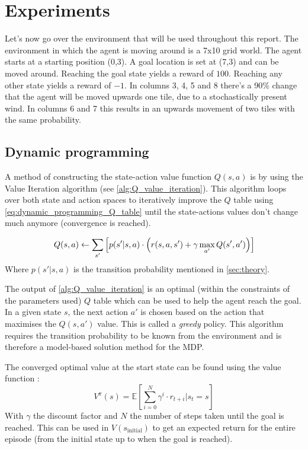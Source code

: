 \documentclass{article}
\theoremstyle{plain}
\theoremstyle{definition}
\theoremstyle{remark}
\begin{document}
\section{Experiments}\label{sec:experiments} %
Let's now go over the environment that will be used throughout this report. The environment in which the agent is moving around is a 7x10 grid world. The agent starts at a starting position (0,3). A goal location is set at (7,3) and can be moved around. Reaching the goal state yields a reward of $100$. Reaching any other state yields a reward of $-1$. In columns 3, 4, 5 and 8 there's a 90\% change that the agent will be moved upwards one tile, due to a stochastically present wind. In columns 6 and 7 this results in an upwards movement of two tiles with the same probability.

\subsection{Dynamic programming}\label{subsec:dynamic_programming}
A method of constructing the state-action value function $Q(s,a)$ is by using the Value Iteration algorithm (see \autoref{alg:Q_value_iteration}). This algorithm loops over both state and action spaces to iteratively improve the $Q$ table using \autoref{eq:dynamic_programming_Q_table} until the state-actions values don't change much anymore (convergence is reached). 

\begin{equation}
    Q(s,a) \leftarrow \sum_{s'}\left[p(s'|s,a) \cdot \left(r(s,a,s') + \\ \gamma \max_{a'}Q(s',a')\right)\right]
    \label{eq:dynamic_programming_Q_table}
\end{equation}
Where $p(s'|s,a)$ is the transition probability mentioned in \autoref{sec:theory}.

The output of \autoref{alg:Q_value_iteration} is an optimal (within the constraints of the parameters used) $Q$ table which can be used to help the agent reach the goal. In a given state $s$, the next action $a'$ is chosen based on the action that maximises the $Q(s,a')$ value. This is called a \textit{greedy} policy. This algorithm requires the transition probability to be known from the environment and is therefore a model-based solution method for the MDP. 


The converged optimal value at the start state can be found using the value function \cite{RL_book}:
\begin{equation}
    V^\pi(s) = \mathds{E}\left[\sum_{i=0}^N \gamma^i \cdot r_{t+i}|s_t = s \right]
    \label{eq:value_function}
\end{equation}
With $\gamma$ the discount factor and $N$ the number of steps taken until the goal is reached. This can be used in $V(s_\text{initial})$ to get an expected return for the entire episode (from the initial state up to when the goal is reached).
\end{document}
